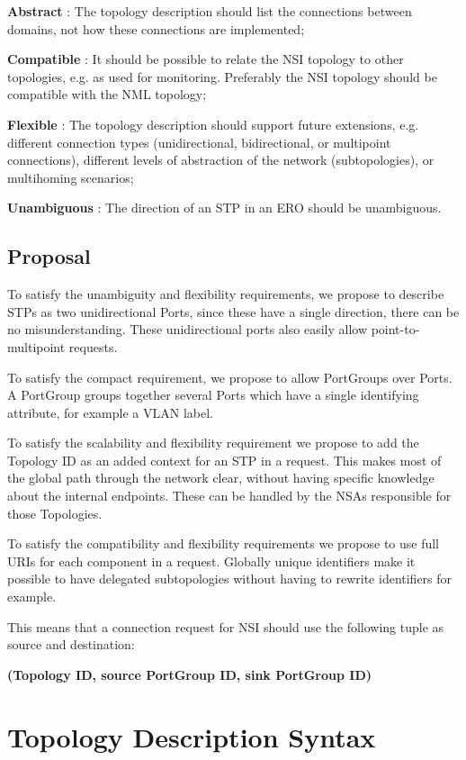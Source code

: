 \documentclass[12pt]{article}  %
\begin{document}
 \textbf{Abstract} : The topology description 
should list the connections between domains, not how these connections are implemented;

 \textbf{Compatible} : It should be possible to 
relate the NSI topology to other topologies, e.g. as used for monitoring. Preferably 
the NSI topology should be compatible with the NML topology;

 \textbf{Flexible} : The topology description 
should support future extensions, e.g. different connection types (unidirectional, 
bidirectional, or multipoint connections), different levels of abstraction of the 
network (subtopologies), or multihoming scenarios;

 \textbf{Unambiguous} : The direction of an STP 
in an ERO should be unambiguous.\label{h.72kynww9xxpz}


\subsection{Proposal}

 To satisfy the unambiguity and flexibility requirements, we propose 
to describe STPs as two unidirectional Ports, since these have a single direction, 
there can be no misunderstanding. These unidirectional ports also easily allow 
point-to-multipoint requests.

 To satisfy the compact requirement, we propose to allow PortGroups 
over Ports. A PortGroup groups together several Ports which have a single identifying 
attribute, for example a VLAN label.

 To satisfy the scalability and flexibility requirement we propose 
to add the Topology ID as an added context for an STP in a request. This makes 
most of the global path through the network clear, without having specific knowledge 
about the internal endpoints. These can be handled by the NSAs responsible for 
those Topologies.

 To satisfy the compatibility and flexibility requirements we propose 
to use full URIs for each component in a request. Globally unique identifiers make 
it possible to have delegated subtopologies without having to rewrite identifiers 
for example.


 This means that a connection request for NSI should use the following 
tuple as source and destination:

 \textbf{(Topology ID, source PortGroup ID, sink PortGroup ID)}


\section{Topology Description Syntax}
\end{document}

